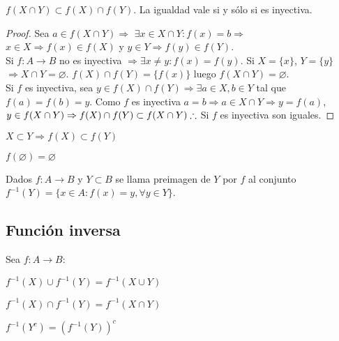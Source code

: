 \begin{prop}
    $f(X \cap Y) \subset f(X) \cap f(Y)$. La igualdad vale si y sólo si es inyectiva.
    \begin{proof}
        Sea $a \in f(X \cap Y) \Rightarrow $ $\exists x \in X \cap Y : f(x) = b \Rightarrow$ $ x \in X \Rightarrow f(x) \in f(X) $ y $ y \in Y \Rightarrow f(y) \in f(Y). $ \\ Si $f: A \to B$ no es inyectiva $\Rightarrow \exists x \neq y : f(x) = f(y)$. Si $X = \{x\}$, $Y = \{y\}$ $\Rightarrow X \cap Y = \varnothing$. $f(X) \cap f(Y) = \{f(x)\}$ luego $f(X \cap Y) = \varnothing$. \\ Si $f$ es inyectiva, sea $y \in f(X) \cap f(Y) \Rightarrow \exists a \in X, b \in Y$ tal que $f(a) = f(b) = y$. Como $f$ es inyectiva $a = b \Rightarrow a \in X \cap Y \Rightarrow y = f(a)$, $y \in f(X \cap Y) \Rightarrow f(X) \cap f(Y) \subset f(X \cap Y) \\
            \therefore$ Si $f$ es inyectiva son iguales.
    \end{proof}
\end{prop}


\begin{prop}
    $X \subset Y \Rightarrow f(X) \subset f(Y)$
\end{prop}

\begin{prop}
    $f(\varnothing) = \varnothing$
\end{prop}

\begin{definition}
    Dados $f: A \to B$ y $Y \subset B$ se llama preimagen de $Y$ por $f$ al conjunto $f^{-1}(Y) = \{x \in A : f(x) = y, \forall y \in Y\}$.
\end{definition}

\subsection{Función inversa}

Sea $f: A \to B$:

\begin{prop}
    $f^{-1}(X) \cup f^{-1}(Y) = f^{-1}(X \cup Y)$
\end{prop}

\begin{prop}
    $f^{-1}(X) \cap f^{-1}(Y) = f^{-1}(X \cap Y)$
\end{prop}

\begin{prop}
    $f^{-1}(Y^c) = (f^{-1}(Y))^c$
\end{prop}

